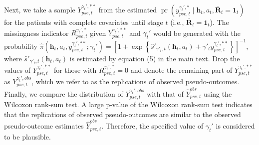 \documentclass[12pt]{article}
\DeclareMathOperator{\pr}{pr}
\begin{document}
Next, we take a sample  $Y_{pse,t}^{\gamma_t',**}$ from the estimated $\pr(y_{pse,t}^{\gamma_t',*}\mid \bm{h}_t,a_t, \overline{\bm{R}}_t=\bm{1}_t)$  for the patients with complete covariates until stage $t$ (i.e., $\overline{\bm{R}}_t=\bm{1}_t$).
The missingness indicator $R_{pse,t}^{\gamma_t',*}$ given $Y_{pse,t}^{\gamma_t',**}$ and $\gamma_t'$ would be generated  with the probability $\widehat{\pi}(\bm{h}_t,a_t,y_{pse,t}^{\gamma_t',**};\gamma_t') = \left[1+\exp\left\{\widehat{s}'_{\gamma'_t,t}(\bm{h}_t,a_t) +\gamma'_t y_{pse,t}^{\gamma_t',**}\right\}\right]^{-1}$, where $\widehat{s}'_{\gamma'_t,t}(\bm{h}_t,a_t)$ is estimated by equation (5) in the main text. Drop the values of $Y_{pse,t}^{\gamma_t',**}$ for those with $R_{pse,t}^{\gamma_t',*}=0$ and denote the remaining part of $Y_{pse,t}^{\gamma_t',**}$ as $Y_{pse,t}^{\gamma_t',obs}$, which we refer to as the replications of  observed pseudo-outcomes.
Finally, we compare the distribution of $Y_{pse,t}^{\gamma_t',obs}$ with that of $\widehat{Y}_{pse,t}^{obs}$ using the Wilcoxon rank-sum test.  A large  p-value of the Wilcoxon rank-sum test indicates that the replications of  observed pseudo-outcomes are similar to the observed pseudo-outcome estimates $\widehat{Y}_{pse,t}^{obs}$. Therefore, the specified value of $\gamma_t'$ is considered to be plausible.  
\end{document}
